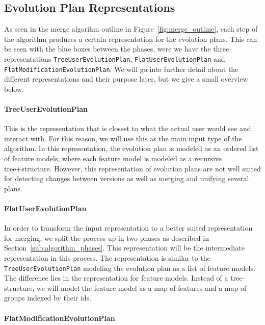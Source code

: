 \documentclass[a4paper,english]{ifimaster}
\begin{document}
\subsection{Evolution Plan Representations}%
\label{sub:evolution_plan_representations}

As seen in the merge algorihm outline in Figure~\ref{fig:merge_outline}, each step of the algorithm produces a certain representation for the evolution plans. This can be seen with the blue boxes between the phases, were we have the three representations \texttt{Tree\-User\-Evolution\-Plan}, \texttt{Flat\-User\-Evolution\-Plan} and \texttt{Flat\-Modification\-Evolution\-Plan}. We will go into further detail about the different representations and their purpose later, but we give a small overview below.

\paragraph{TreeUserEvolutionPlan}%
\label{par:treeuserevolutionplan}

This is the representation that is closest to what the actual user would see and interact with. For this reason, we will use this as the main input type of the algorithm. In this representation, the evolution plan is modeled as an ordered list of feature models, where each feature model is modeled as a recursive tree+structure. However, this representation of evolution plans are not well suited for detecting changes between versions as well as merging and unifying several plans.

\paragraph{FlatUserEvolutionPlan}%
\label{par:flatuserevolutionplan}

In order to transform the input representation to a better suited representation for merging, we split the process up in two phases as described in Section~\vref{sub:algorithm_phases}. This representation will be the intermediate representation in this process. The representation is similar to the \texttt{Tree\-User\-Evolution\-Plan} modeling the evolution plan as a list of feature models. The difference lies in the representation for feature models. Instead of a tree-structure, we will model the feature model as a map of features and a map of groups indexed by their ids.

\paragraph{FlatModificationEvolutionPlan}%
\label{par:flatmodificationevolutionplan}
\end{document}
